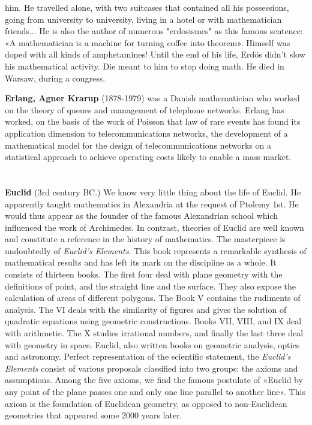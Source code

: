 him. He travelled alone, with two suitcases that contained all his possessions, going from university to university, living in a hotel or with mathematician friends... He is also the author of numerous "erdosismes" as this famous sentence: «A mathematician is a machine for turning coffee into theorem». Himself was doped with all kinds of amphetamines! Until the end of his life, Erdös didn't slow his mathematical activity. Die meant to him to stop doing math. He died in Warsaw, during a congress.

\textbf{Erlang, Agner Krarup} (1878-1979) was a Danish mathematician who worked on the theory of queues and management of telephone networks. Erlang has worked, on the basis of the work of Poisson that law of rare events has found its application dimension to telecommunications networks, the development of a mathematical model for the design of telecommunications networks on a statistical approach to achieve operating costs likely to enable a mass market.\\\\\\

\textbf{Euclid} (3rd century BC.) We know very little thing about the life of Euclid. He apparently taught mathematics in Alexandria at the request of Ptolemy 1st. He would thus appear as the founder of the famous Alexandrian school which influenced the work of Archimedes. In contrast, theories of Euclid are well known and constitute a reference in the history of mathematics. The masterpiece is undoubtedly of \textit{Euclid's Elements}. This book represents a remarkable synthesis of mathematical results and has left its mark on the discipline as a whole. It consists of thirteen books. The first four deal with plane geometry with the definitions of point, and the straight line and the surface. They also expose the calculation of areas of different polygons. The Book V contains the rudiments of analysis. The VI deals with the similarity of figures and gives the solution of quadratic equations using geometric constructions. Books VII, VIII, and IX deal with arithmetic. The X studies irrational numbers, and finally the last three deal with geometry in space. Euclid, also written books on geometric analysis, optics and astronomy. Perfect representation of the scientific statement, the \textit{Euclid's Elements} consist of various proposals classified into two groups: the axioms and assumptions. Among the five axioms, we find the famous postulate of «Euclid by any point of the plane passes one and only one line parallel to another line». This axiom is the foundation of Euclidean geometry, as opposed to non-Euclidean geometries that appeared some 2000 years later.

